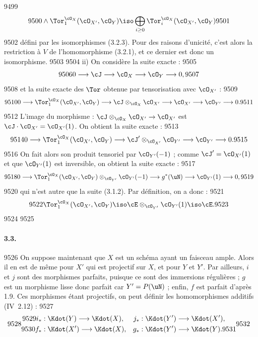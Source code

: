   9499	\[
  9500	\wedge \Tor_1^{\cO_X}(\cO_{X'}, \cO_Y) \iso \bigoplus_{i \geq 0} \Tor_i^{\cO_X}(\cO_{X'}, \cO_Y)
  9501	\]
  9502	d\'efini par les isomorphismes (3.2.3). Pour des raisons d'unicit\'e, c'est alors la restriction \`a $V$ de l'homomorphisme (3.2.1), et ce dernier est donc un isomorphisme.
  9503	
  9504	ii) On consid\`ere la suite exacte :
  9505	\[
  9506	0 \longrightarrow \cJ \longrightarrow \cO_X \longrightarrow \cO_Y \longrightarrow 0,
  9507	\]
  9508	et la suite exacte des $\Tor$ obtenue par tensorisation avec $\cO_{X'}$ :
  9509	\[
  9510	0 \longrightarrow \Tor_1^{\cO_X}(\cO_{X'}, \cO_Y) \longrightarrow \cJ \otimes_{\cO_X} \cO_{X'} \longrightarrow \cO_{X'} \longrightarrow \cO_{Y'} \longrightarrow 0.
  9511	\]
  9512	L'image du morphisme : $\cJ \otimes_{\cO_X} \cO_{X'} \to \cO_{X'}$ est $\cJ \cdot \cO_{X'} = \cO_{X'}(1)$. On obtient la suite exacte :
  9513	\[
  9514	0 \longrightarrow \Tor_1^{\cO_X}(\cO_{X'}, \cO_Y) \longrightarrow \cJ' \otimes_{\cO_{X'}} \cO_{Y'} \longrightarrow \cO_{Y'} \longrightarrow 0.
  9515	\]
  9516	On fait alors son produit tensoriel par $\cO_{Y'}(-1)$ ; comme $\cJ' = \cO_{X'}(1)$ et que $\cO_{Y'}(1)$ est inversible, on obtient la suite exacte :
  9517	\[
  9518	0 \longrightarrow \Tor_1^{\cO_X}(\cO_{X'}, \cO_Y) \otimes_{\cO_{Y'}} \cO_{Y'}(-1) \longrightarrow g^{*}(\uN) \longrightarrow \cO_{Y'}(1) \longrightarrow 0,
  9519	\]
  9520	qui n'est autre que la suite (3.1.2). Par d\'efinition, on a donc :
  9521	\[
  9522	\Tor_1^{\cO_X}(\cO_{X'}, \cO_Y) \iso \cE \otimes_{\cO_{Y'}} \cO_{Y'}(1) \iso \cE.
  9523	\]
  9524	
  9525	\paragraph{3.3.}
  9526	On suppose maintenant que $X$ est un sch\'ema ayant un faisceau ample. Alors il en est de m\^eme pour $X'$ qui est projectif sur $X$, et pour $Y$ et $Y'$. Par ailleurs, $i$ et $j$ sont des morphismes parfaits, puisque ce sont des immersions r\'eguli\`eres ; $g$ est un morphisme lisse donc parfait car $Y' = P(\uN)$ ; enfin, $f$ est parfait d'apr\`es 1.9. Ces morphismes \'etant projectifs, on peut d\'efinir les homomorphismes additifs (IV~2.12) :
  9527	\[
  9528	\begin{aligned}
  9529	i_{*} &: \Kdot(Y) \longrightarrow \Kdot(X), & j_{*} &: \Kdot(Y') \longrightarrow \Kdot(X'), \\
  9530	f_{*} &: \Kdot(X') \longrightarrow \Kdot(X), & g_{*} &: \Kdot(Y') \longrightarrow \Kdot(Y).
  9531	\end{aligned}
  9532	\]
